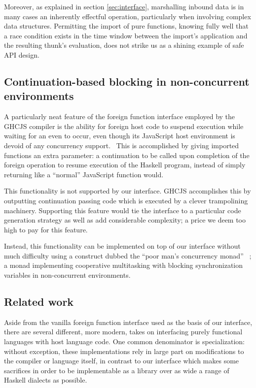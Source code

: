 \documentclass{sigplanconf}
\begin{document}
Moreover, as explained in section \ref{sec:interface}, marshalling inbound
data is in many cases an inherently effectful operation, particularly when
involving complex data structures. Permitting the import of pure functions,
knowing fully well that a race condition exists in the time window between
the import's application and the resulting thunk's evaluation, does not strike
us as a shining example of safe API design.

\subsection{Continuation-based blocking in non-concurrent environments}
A particularly neat feature of the foreign function interface employed by the
GHCJS compiler is the ability for foreign host code to suspend execution while
waiting for an even to occur, even though its JavaScript host environment is
devoid of any concurrency support.\ \cite{ghcjs}
This is accomplished by giving imported functions an extra parameter:
a continuation to be called upon completion
of the foreign operation to resume execution of the Haskell program, instead
of simply returning like a ``normal'' JavaScript function would.

This functionality is not supported by our interface. GHCJS accomplishes this
by outputting continuation passing code which is executed by a clever
trampolining machinery. Supporting this feature would tie the interface to
a particular code generation strategy as well as add considerable complexity;
a price we deem too high to pay for this feature.

Instead, this functionality can be implemented on top of our interface without
much difficulty using a construct dubbed the ``poor man's concurrency monad''
\ \cite{poormansconcurrencymonad}; a monad implementing cooperative
multitasking with blocking synchronization variables in non-concurrent
environments.

\subsection{Related work}\label{sec:related}
Aside from the vanilla foreign function interface used as the basis of our
interface, there are several different, more modern, takes on interfacing
purely functional languages with host language code.
One common denominator is specialization: without exception, these
implementations rely in large part on modifications to the compiler or
language itself, in contrast to our interface which makes some sacrifices
in order to be implementable as a library over as wide a range of Haskell
dialects as possible.
\end{document}
